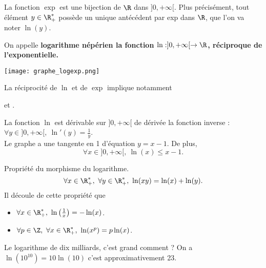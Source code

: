 \documentclass[11pt]{article}
\begin{document}
La fonction $\exp$ est une bijection de $\R$ dans $]0,+\infty[$. Plus précisément, tout élément $y\in\R_+^*$ possède un unique antécédent par exp dans $\R$, que l'on va noter $\ln(y)$.

\begin{defi}{}{}
    On appelle \bf{logarithme népérien} la fonction $\ln:]0,+\infty[\to\R$, réciproque de l'exponentielle.
\end{defi}

\begin{center}
    \texttt{[image: graphe\_logexp.png]}
\end{center}

La réciprocité de $\ln$ et de $\exp$ implique notamment
\begin{center}
     \quad et \quad \boxed{\forall y \in ]0,+\infty[, ~ \exp(\ln(y))=y}.
\end{center}

\begin{prop}{}{}
    La fonction $\ln$ est dérivable sur $]0,+\infty[$ de dérivée la fonction inverse : $\forall y \in ]0,+\infty[,~\ln'(y)=\frac{1}{y}$.\\
    Le graphe a une tangente en 1 d'équation $y=x-1$. De plus,
    \begin{equation*}
        \forall x \in ]0,+\infty[,~\ln(x)\leq x-1.
    \end{equation*}
\end{prop}

\begin{prop}{Propriété du morphisme du logarithme.}{}
    \begin{equation*}
        \forall x \in \R^*_+,~\forall y \in \R^*_+,~\ln(xy)=\ln(x)+\ln(y).
    \end{equation*}
    Il découle de cette propriété que
    \begin{itemize}
        \item $\forall x \in \R^*_+,~\ln\left( \frac{1}{x} \right)=-\ln(x)$.
        \item $\forall p \in \Z,~\forall x \in \R_+^*,~\ln(x^p)=p\ln(x)$.
    \end{itemize}
\end{prop}

\begin{ex}{}{}
    Le logarithme de dix milliards, c'est grand comment ?
    \tcblower
    On a $\ln(10^{10})=10\ln(10)$ c'est approximativement 23.
\end{ex}
\end{document}

